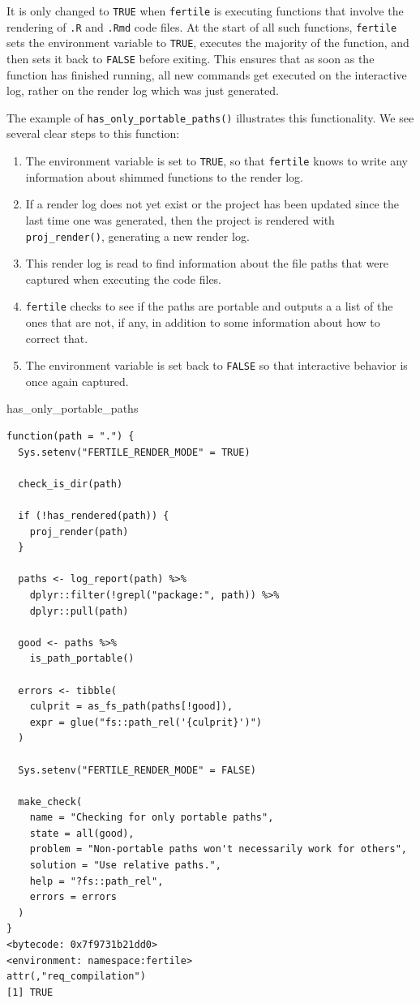 \documentclass[12pt,twoside]{reedthesis}
\newenvironment{Shaded}{\begin{snugshade}}{\end{snugshade}}
\newcommand{\NormalTok}[1]{#1}
\begin{document}
It is only changed to \texttt{TRUE} when \texttt{fertile} is executing functions that involve the rendering of \texttt{.R} and \texttt{.Rmd} code files. At the start of all such functions, \texttt{fertile} sets the environment variable to \texttt{TRUE}, executes the majority of the function, and then sets it back to \texttt{FALSE} before exiting. This ensures that as soon as the function has finished running, all new commands get executed on the interactive log, rather on the render log which was just generated.

The example of \texttt{has\_only\_portable\_paths()} illustrates this functionality. We see several clear steps to this function:
\begin{enumerate}
\def\labelenumi{\arabic{enumi}.}
\item
  The environment variable is set to \texttt{TRUE}, so that \texttt{fertile} knows to write any information about shimmed functions to the render log.
\item
  If a render log does not yet exist or the project has been updated since the last time one was generated, then the project is rendered with \texttt{proj\_render()}, generating a new render log.
\item
  This render log is read to find information about the file paths that were captured when executing the code files.
\item
  \texttt{fertile} checks to see if the paths are portable and outputs a a list of the ones that are not, if any, in addition to some information about how to correct that.
\item
  The environment variable is set back to \texttt{FALSE} so that interactive behavior is once again captured.
\end{enumerate}
\begin{Shaded}
\begin{Highlighting}[]
\NormalTok{has\_only\_portable\_paths}
\end{Highlighting}
\end{Shaded}
\begin{verbatim}
function(path = ".") {
  Sys.setenv("FERTILE_RENDER_MODE" = TRUE)

  check_is_dir(path)

  if (!has_rendered(path)) {
    proj_render(path)
  }

  paths <- log_report(path) %>%
    dplyr::filter(!grepl("package:", path)) %>%
    dplyr::pull(path)

  good <- paths %>%
    is_path_portable()

  errors <- tibble(
    culprit = as_fs_path(paths[!good]),
    expr = glue("fs::path_rel('{culprit}')")
  )

  Sys.setenv("FERTILE_RENDER_MODE" = FALSE)

  make_check(
    name = "Checking for only portable paths",
    state = all(good),
    problem = "Non-portable paths won't necessarily work for others",
    solution = "Use relative paths.",
    help = "?fs::path_rel",
    errors = errors
  )
}
<bytecode: 0x7f9731b21dd0>
<environment: namespace:fertile>
attr(,"req_compilation")
[1] TRUE
\end{verbatim}
\end{document}
